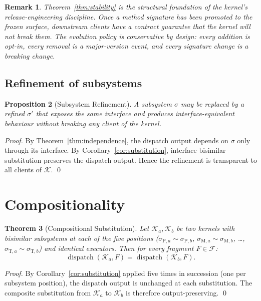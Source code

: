 \documentclass[twocolumn,11pt,a4paper]{article}
\newtheorem{theorem}{Theorem}[section]
\newtheorem{proposition}[theorem]{Proposition}
\newtheorem{remark}[theorem]{Remark}
\DeclareMathOperator{\dispatch}{dispatch}
\newcommand{\Kernel}{\mathcal{K}}
\newcommand{\Frag}{F}
\newcommand{\Sub}{\sigma}
\newcommand{\bisim}{\sim}
\begin{document}
\begin{remark}
Theorem~\ref{thm:stability} is the structural foundation of the kernel's release-engineering discipline. Once a method signature has been promoted to the frozen surface, downstream clients have a contract guarantee that the kernel will not break them. The evolution policy is conservative by design: every addition is opt-in, every removal is a major-version event, and every signature change is a breaking change.
\end{remark}

\subsection{Refinement of subsystems}

\begin{proposition}[Subsystem Refinement]
\label{prop:refinement}
A subsystem $\Sub$ may be replaced by a refined $\Sub'$ that exposes the same interface and produces interface-equivalent behaviour without breaking any client of the kernel.
\end{proposition}

\begin{proof}
By Theorem~\ref{thm:independence}, the dispatch output depends on $\Sub$ only through its interface. By Corollary~\ref{cor:substitution}, interface-bisimilar substitution preserves the dispatch output. Hence the refinement is transparent to all clients of $\Kernel$. \qed
\end{proof}

\section{Compositionality}
\label{sec:compositionality}

\begin{theorem}[Compositional Substitution]
\label{thm:compose-kernel}
Let $\Kernel_a, \Kernel_b$ be two kernels with bisimilar subsystems at each of the five positions ($\sigma_{\mathrm{P},a} \bisim \sigma_{\mathrm{P},b}$, $\sigma_{\mathrm{M},a} \bisim \sigma_{\mathrm{M},b}$, \ldots, $\sigma_{\mathrm{T},a} \bisim \sigma_{\mathrm{T},b}$) and identical executors. Then for every fragment $\Frag \in \mathcal{F}$:
\[
\dispatch(\Kernel_a, \Frag) = \dispatch(\Kernel_b, \Frag).
\]
\end{theorem}

\begin{proof}
By Corollary~\ref{cor:substitution} applied five times in succession (one per subsystem position), the dispatch output is unchanged at each substitution. The composite substitution from $\Kernel_a$ to $\Kernel_b$ is therefore output-preserving. \qed
\end{proof}
\end{document}
